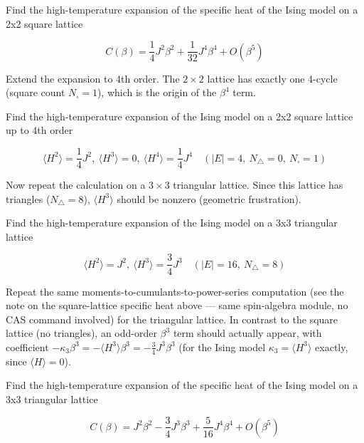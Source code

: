 \documentclass[dvipdfmx]{article}
\begin{document}
Find the high-temperature expansion of the specific heat of the Ising model on a 2x2 square lattice

\begin{equation}
  C(\beta) = \frac{1}{4} J^{2} \beta^{2} + \frac{1}{32} J^{4} \beta^{4} + O(\beta^5)
  \label{eq:E3}
\end{equation}

Extend the expansion to 4th order. The $2\times2$ lattice has exactly one 4-cycle (square count $N_\square=1$), which is the origin of the $\beta^4$ term.

Find the high-temperature expansion of the Ising model on a 2x2 square lattice up to 4th order

\begin{equation}
  \langle H^2 \rangle = \frac{1}{4} J^{2},\ \langle H^3 \rangle = 0,\ \langle H^4 \rangle = \frac{1}{4} J^{4} \quad (|E| = 4,\ N_\triangle = 0,\ N_\square = 1)
  \label{eq:E4}
\end{equation}

Now repeat the calculation on a $3\times3$ triangular lattice. Since this lattice has triangles ($N_\triangle=8$), $\langle H^3\rangle$ should be nonzero (geometric frustration).

Find the high-temperature expansion of the Ising model on a 3x3 triangular lattice

\begin{equation}
  \langle H^2 \rangle = J^{2},\ \langle H^3 \rangle = \frac{3}{4} J^{3} \quad (|E| = 16,\ N_\triangle = 8)
  \label{eq:E5}
\end{equation}

Repeat the same moments-to-cumulants-to-power-series computation (see the note on the square-lattice specific heat above — same spin-algebra module, no CAS command involved) for the triangular lattice. In contrast to the square lattice (no triangles), an odd-order $\beta^3$ term should actually appear, with coefficient $-\kappa_3\beta^3=-\langle H^3\rangle\beta^3=-\tfrac34J^3\beta^3$ (for the Ising model $\kappa_3=\langle H^3\rangle$ exactly, since $\langle H\rangle=0$).

Find the high-temperature expansion of the specific heat of the Ising model on a 3x3 triangular lattice

\begin{equation}
  C(\beta) = J^{2} \beta^{2} - \frac{3}{4} J^{3} \beta^{3} + \frac{5}{16} J^{4} \beta^{4} + O(\beta^5)
  \label{eq:E6}
\end{equation}
\end{document}
